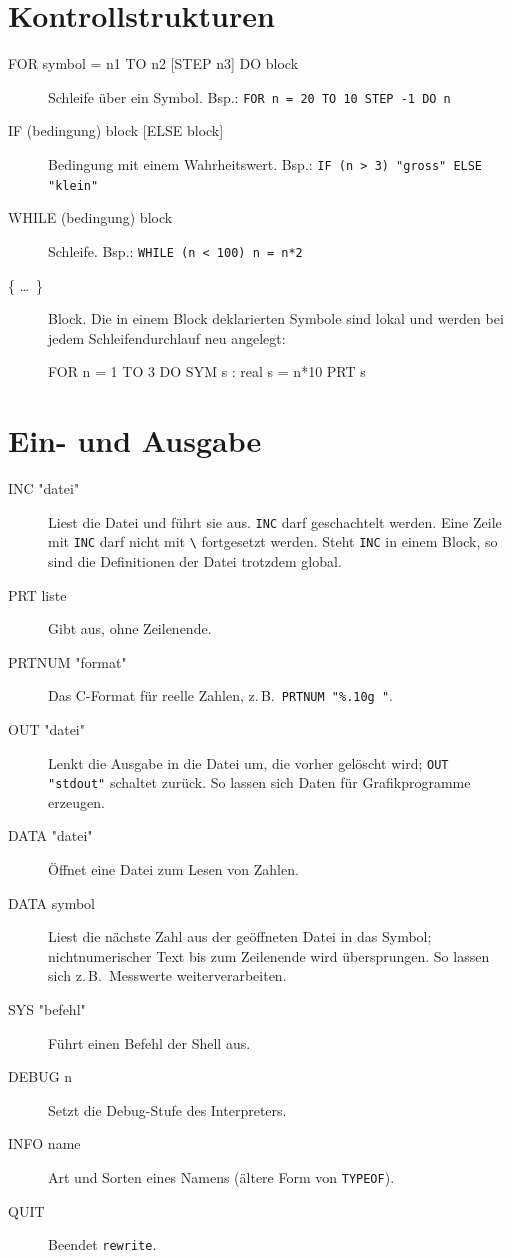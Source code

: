 \documentclass[a4paper,11pt]{article}
\newcommand{\rw}{\texttt{rewrite}}
\newcommand{\kw}[1]{\texttt{#1}}
\begin{document}
\section{Kontrollstrukturen}
\begin{description}
\item[FOR symbol = n1 TO n2 {[}STEP n3{]} DO block]
  Schleife über ein Symbol. Bsp.: \kw{FOR n = 20 TO 10 STEP -1 DO n}
\item[IF (bedingung) block {[}ELSE block{]}]
  Bedingung mit einem Wahrheitswert. Bsp.:
  \kw{IF (n > 3) "gross" ELSE "klein"}
\item[WHILE (bedingung) block]
  Schleife. Bsp.: \kw{WHILE (n < 100) n = n*2}
\item[\{ \ldots\ \}]
  Block. Die in einem Block deklarierten Symbole sind lokal und werden
  bei jedem Schleifendurchlauf neu angelegt:
\begin{beispiel}
FOR n = 1 TO 3 DO { SYM s : real
                    s = n*10
                    PRT s }
\end{beispiel}
\end{description}

\section{Ein- und Ausgabe}
\begin{description}
\item[INC "datei"]
  Liest die Datei und führt sie aus. \kw{INC} darf geschachtelt werden.
  Eine Zeile mit \kw{INC} darf nicht mit \verb|\| fortgesetzt werden.
  Steht \kw{INC} in einem Block, so sind die Definitionen der Datei
  trotzdem global.
\item[PRT liste]
  Gibt aus, ohne Zeilenende.
\item[PRTNUM "format"]
  Das C-Format für reelle Zahlen, z.\,B.\ \kw{PRTNUM "\%.10g "}.
\item[OUT "datei"]
  Lenkt die Ausgabe in die Datei um, die vorher gelöscht wird;
  \kw{OUT "stdout"} schaltet zurück. So lassen sich Daten für
  Grafikprogramme erzeugen.
\item[DATA "datei"]
  Öffnet eine Datei zum Lesen von Zahlen.
\item[DATA symbol]
  Liest die nächste Zahl aus der geöffneten Datei in das Symbol;
  nichtnumerischer Text bis zum Zeilenende wird übersprungen. So lassen
  sich z.\,B.\ Messwerte weiterverarbeiten.
\item[SYS "befehl"]
  Führt einen Befehl der Shell aus.
\item[DEBUG n]
  Setzt die Debug-Stufe des Interpreters.
\item[INFO name]
  Art und Sorten eines Namens (ältere Form von \kw{TYPEOF}).
\item[QUIT]
  Beendet \rw.
\end{description}
\end{document}
